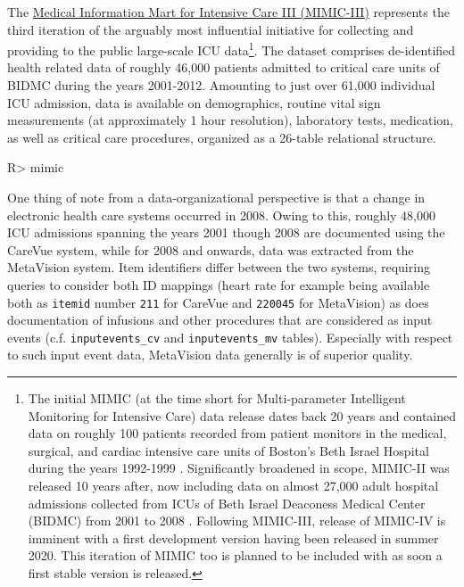 \documentclass[
]{jss}
\begin{document}
The \href{https://physionet.org/content/mimiciii/1.4/}{Medical
Information Mart for Intensive Care III (MIMIC-III)} represents the
third iteration of the arguably most influential initiative for
collecting and providing to the public large-scale ICU data\footnote{The
  initial MIMIC (at the time short for Multi-parameter Intelligent
  Monitoring for Intensive Care) data release dates back 20 years and
  contained data on roughly 100 patients recorded from patient monitors
  in the medical, surgical, and cardiac intensive care units of Boston's
  Beth Israel Hospital during the years 1992-1999 \citep{moody1996}.
  Significantly broadened in scope, MIMIC-II was released 10 years
  after, now including data on almost 27,000 adult hospital admissions
  collected from ICUs of Beth Israel Deaconess Medical Center (BIDMC)
  from 2001 to 2008 \citep{lee2011}. Following MIMIC-III, release of
  MIMIC-IV is imminent with a first development version having been
  released in summer 2020. This iteration of MIMIC too is planned to be
  included with  as soon a first stable version is released.}.
The dataset comprises de-identified health related data of roughly
46,000 patients admitted to critical care units of BIDMC during the
years 2001-2012. Amounting to just over 61,000 individual ICU admission,
data is available on demographics, routine vital sign measurements (at
approximately 1 hour resolution), laboratory tests, medication, as well
as critical care procedures, organized as a 26-table relational
structure.

\begin{CodeChunk}
\begin{CodeInput}
R> mimic
\end{CodeInput}
\end{CodeChunk}

One thing of note from a data-organizational perspective is that a
change in electronic health care systems occurred in 2008. Owing to
this, roughly 48,000 ICU admissions spanning the years 2001 though 2008
are documented using the CareVue system, while for 2008 and onwards,
data was extracted from the MetaVision system. Item identifiers differ
between the two systems, requiring queries to consider both ID mappings
(heart rate for example being available both as \texttt{itemid} number
\texttt{211} for CareVue and \texttt{220045} for MetaVision) as does
documentation of infusions and other procedures that are considered as
input events (c.f. \texttt{inputevents\_cv} and \texttt{inputevents\_mv}
tables). Especially with respect to such input event data, MetaVision
data generally is of superior quality.
\end{document}
